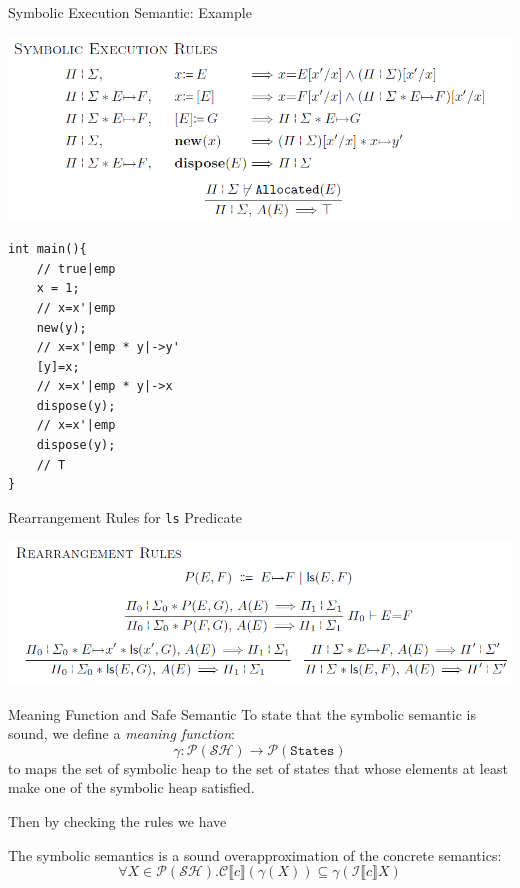 \documentclass[aspectratio=1610, 13pt]{beamer}
\begin{document}
\begin{frame}[fragile]{Symbolic Execution Semantic: Example}
\begin{center}
    \includegraphics[scale=0.35]{symb_exec.png}
\end{center}
\begin{example}
\begin{center}
    
\begin{multicols}{2}
\begin{lstlisting}
int main(){
    // true|emp
    x = 1;
    // x=x'|emp
    new(y);
    // x=x'|emp * y|->y'
    [y]=x;
    // x=x'|emp * y|->x
    dispose(y);
    // x=x'|emp
    dispose(y);
    // T
}
\end{lstlisting}
\end{multicols}
\end{center}
\end{example}


\end{frame}

\begin{frame}{Rearrangement Rules for \texttt{ls} Predicate}
    \begin{center}
        \includegraphics[scale=0.5]{rar.png}
    \end{center}
    
\end{frame}

\begin{frame}{Meaning Function and Safe Semantic}
    To state that the symbolic semantic is sound, we define a \emph{meaning function}:
    \[\gamma: \mathcal{P(SH)}\rightarrow \mathcal{P}(\mathtt{States})\]
    to maps the set of symbolic heap to the set of states that whose elements at least make one of the symbolic heap satisfied.
    
    Then by checking the rules we have
    \begin{theorem}
    The symbolic semantics is a sound overapproximation of the concrete semantics:
    \[\forall X\in \mathcal{P(SH)}. \mathcal{C}\llbracket c\rrbracket(\gamma(X)) \subseteq \gamma(\mathcal{I}\llbracket c\rrbracket X)\]
    
    \end{theorem}
\end{frame}
\end{document}
